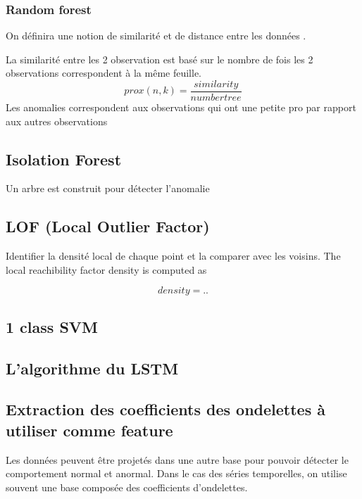 \subsubsection{Random forest}
On définira une notion de similarité et de distance entre les données .

La similarité entre les 2 observation est basé sur le nombre de fois les 2 observations
correspondent à la même feuille. 
\begin{equation}
prox(n,k)= \frac{similarity}{number tree}
\end{equation}
Les anomalies correspondent aux observations qui ont une petite pro par rapport aux autres observations 

\subsection{Isolation Forest}
Un arbre est construit pour détecter l'anomalie




\subsection{LOF (Local Outlier Factor)}
Identifier la densité local de chaque point et la comparer avec les voisins.
The local reachibility factor density is computed as

\begin{equation}
density  = ..
\end{equation}
\paragraph{}


\subsection{1 class SVM}


\subsection{L'algorithme du LSTM}

\subsection{Extraction des coefficients des ondelettes à utiliser comme feature}
Les données peuvent être projetés dans une autre base pour pouvoir détecter le comportement normal et anormal.
Dans le cas des séries temporelles, on utilise souvent une base composée des coefficients d'ondelettes.

